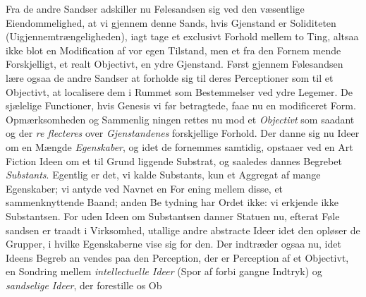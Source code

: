 \documentclass[12pt,a4paper]{book}
\begin{document}
Fra de andre Sandser adskiller nu Følesandsen sig ved
den væsentlige Eiendommelighed, at vi gjennem denne Sands,
hvis Gjenstand er Soliditeten (Uigjennemtrængeligheden), iagt\-%
tage et exclusivt Forhold mellem to Ting, altsaa ikke blot en
Modification af vor egen Tilstand, men et fra den Fornem\-%
mende Forskjelligt, et realt Objectivt, en ydre Gjenstand.
Først gjennem Følesandsen lære ogsaa de andre Sandser at
forholde sig til deres Perceptioner som til et Objectivt, at
localisere dem i Rummet som Bestemmelser ved ydre Legemer.
De sjælelige Functioner, hvis Genesis vi før betragtede, faae
nu en modificeret Form. Opmærksomheden og Sammenlig\-%
ningen rettes nu mod et \emph{Objectivt} som saadant og der \emph{re\-%
flecteres} over \emph{Gjenstandenes} forskjellige Forhold. Der
danne sig nu Ideer om en Mængde \emph{Egenskaber}, og idet de
fornemmes samtidig, opstaaer ved en Art Fiction Ideen om
et til Grund liggende Substrat, og saaledes dannes Begrebet
\emph{Substants}. Egentlig er det, vi kalde Substants, kun et
Aggregat af mange Egenskaber; vi antyde ved Navnet en For\-%
ening mellem disse, et sammenknyttende Baand; anden Be\-%
tydning har Ordet ikke: vi erkjende ikke Substantsen. For\-%
uden Ideen om Substantsen danner Statuen nu, efterat Føle\-%
sandsen er traadt i Virksomhed, utallige andre abstracte Ideer
idet den opløser de Grupper, i hvilke Egenskaberne vise sig
for den. Der indtræder ogsaa nu, idet Ideens Begreb an\-%
vendes paa den Perception, der er Perception af et Objectivt,
en Sondring mellem \emph{intellectuelle Ideer} (Spor af forbi\-%
gangne Indtryk) og \emph{sandselige Ideer}, der forestille os Ob\-%
\end{document}
